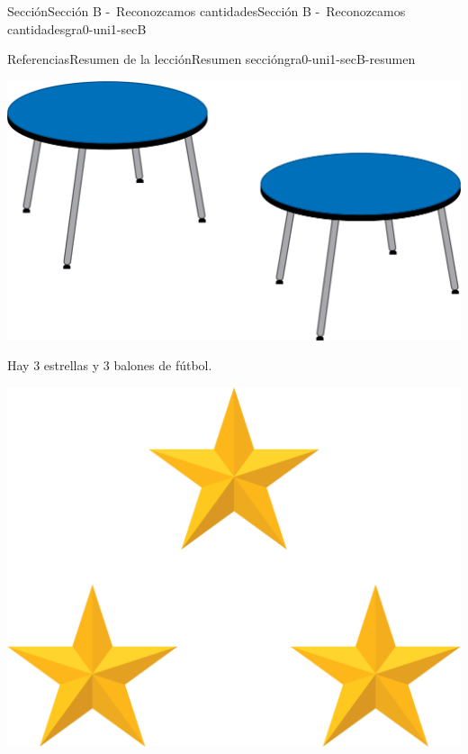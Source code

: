 \documentclass[twoside,10pt,]{article}
\begin{document}
\begin{sectionptx}{Sección}{Sección B -~Reconozcamos cantidades}{}{Sección B -~Reconozcamos cantidades}{}{}{gra0-uni1-secB}
\begin{references-subsection}{Referencias}{Resumen de la lección}{}{Resumen sección}{}{}{gra0-uni1-secB-resumen}
\begin{sidebyside}{2}{0.025}{0.025}{0.05}
\begin{sbspanel}{0.5}
\end{sbspanel}%
\begin{sbspanel}{0.4}%
\includegraphics[width=\linewidth]{external/png-source/2-tables.png}
\end{sbspanel}%
\end{sidebyside}%
\par
Hay 3 estrellas y 3 balones de fútbol.%
\begin{sidebyside}{2}{0.1}{0.1}{0.2}%
\begin{sbspanel}{0.3}%
\includegraphics[width=\linewidth]{external/png-source/K.1.C11.BLM.F.png}
\end{sbspanel}%
\begin{sbspanel}{0.3}%

\end{sbspanel}
\end{sidebyside}
\end{references-subsection}
\end{sectionptx}
\end{document}

